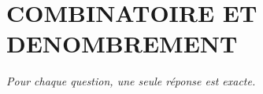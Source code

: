 
\section*{\textcolor{chapcolor}{\MakeUppercase{Combinatoire et denombrement}}}

\begin{center}
\textit{Pour chaque question, une seule réponse est exacte.}
\end{center}

